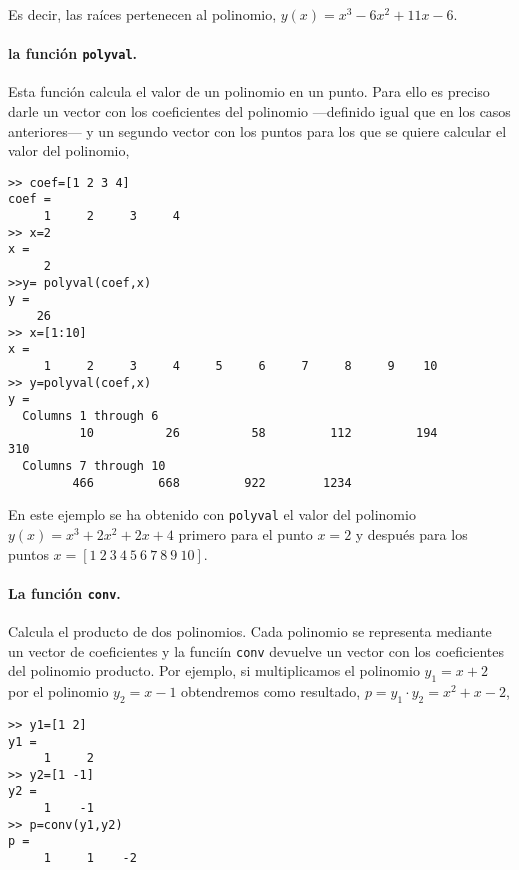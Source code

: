 Es decir, las raíces pertenecen al polinomio, $y(x)=x^3-6x^2+11x-6$.

\paragraph{la función \texttt{polyval}.} Esta función calcula el valor de un polinomio en un punto.  Para ello es preciso darle un vector con los coeficientes del polinomio ---definido igual que en los casos anteriores--- y un segundo vector con los puntos para los que se quiere calcular el valor del polinomio,

\begin{verbatim}
>> coef=[1 2 3 4]
coef =
     1     2     3     4
>> x=2
x =
     2
>>y= polyval(coef,x)
y =
    26
>> x=[1:10]
x =
     1     2     3     4     5     6     7     8     9    10
>> y=polyval(coef,x)
y =
  Columns 1 through 6
          10          26          58         112         194         310
  Columns 7 through 10
         466         668         922        1234
\end{verbatim}  
 

En este ejemplo se ha obtenido con \texttt{polyval} el valor del polinomio $y(x)=x^3+2x^2+2x+4$ primero para el punto $x=2$ y después para los puntos $x=[1\ 2\ 3\ 4\ 5\ 6\ 7\ 8\ 9\ 10]$.

\paragraph{La función \texttt{conv}.} Calcula el producto de dos polinomios. Cada polinomio se representa mediante un vector de coeficientes y la funciín \texttt{conv} devuelve un vector con los coeficientes del polinomio producto. Por ejemplo, si multiplicamos   el polinomio $y_1=x+2$ por el polinomio $y_2=x-1$  obtendremos como resultado, $p=y_1\cdot y_2=x^2+x-2$,  

\begin{verbatim}
>> y1=[1 2]
y1 =
     1     2
>> y2=[1 -1]
y2 =
     1    -1
>> p=conv(y1,y2)
p =
     1     1    -2
\end{verbatim}

